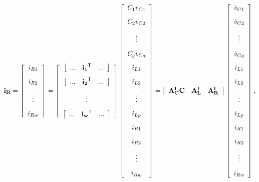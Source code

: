 \begin{equation} \mathbf{i_R} = \left[\begin{array}{c} i_{R1} \\[3mm] i_{R2} \\[3mm] \vdots \\[3mm] i_{Rw} \end{array}\right] = \left[\begin{array}{c} \left[\begin{array}{ccc} ... & \mathbf{i_1}^{\mathsf{T}} & ... \end{array}\right] \\[3mm] \left[\begin{array}{ccc} ... & \mathbf{i_2}^{\mathsf{T}} & ... \end{array}\right] \\[3mm] \vdots \\[3mm] \left[\begin{array}{ccc} ... & \mathbf{i_w}^{\mathsf{T}} & ... \end{array}\right] \end{array}\right] \left[\begin{array}{c} C_1\dot{v}_{C1} \\[3mm] C_2\dot{v}_{C2} \\[3mm] \vdots \\[3mm] C_q\dot{v}_{Cq} \\[3mm] i_{L1} \\[3mm] i_{L2} \\[3mm] \vdots \\[3mm] i_{Lp} \\[3mm] i_{R1} \\[3mm] i_{R2} \\[3mm] \vdots \\[3mm] i_{Rw}\end{array} \right] = \left[\begin{array}{ccc} \mathbf{A^I_CC} & \mathbf{A^I_L} & \mathbf{A^I_R} \end{array}\right] \left[\begin{array}{c} \dot{v}_{C1} \\[3mm] \dot{v}_{C2} \\[3mm] \vdots \\[3mm] \dot{v}_{Cq} \\[3mm] i_{L1} \\[3mm] i_{L2} \\[3mm] \vdots \\[3mm] i_{Lp} \\[3mm] i_{R1} \\[3mm] i_{R2} \\[3mm] \vdots \\[3mm] i_{Rw}\end{array} \right], \end{equation}

